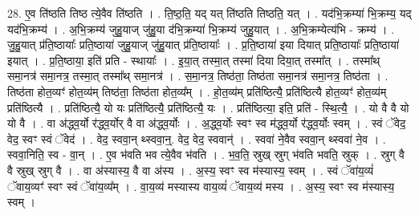 \documentclass[17pt]{extarticle}
\begin{document}
28. ए॒व ति॑ष्ठति तिष्ठ त्ये॒वैव ति॑ष्ठति । . ति॒ष्ठ॒ति॒ यद् यत् ति॑ष्ठति तिष्ठति॒ यत् । . यद॑भि॒क्रम्या॑ भि॒क्रम्य॒ यद् यद॑भि॒क्रम्य॑ । . अ॒भि॒क्रम्य॑ जुहु॒याज् जु॑हु॒या द॑भि॒क्रम्या॑ भि॒क्रम्य॑ जुहु॒यात् । . अ॒भि॒क्रम्येत्य॑भि - क्रम्य॑ । . जु॒हु॒यात् प्र॑ति॒ष्ठायाः᳚ प्रति॒ष्ठाया॑ जुहु॒याज् जु॑हु॒यात् प्र॑ति॒ष्ठायाः᳚ । . प्र॒ति॒ष्ठाया॑ इया दियात् प्रति॒ष्ठायाः᳚ प्रति॒ष्ठाया॑ इयात् । . प्र॒ति॒ष्ठाया॒ इति॑ प्रति - स्थायाः᳚ । . इ॒या॒त् तस्मा॒त् तस्मा॑ दिया दिया॒त् तस्मा᳚त् । . तस्मा᳚थ् समा॒नत्र॑ समा॒नत्र॒ तस्मा॒त् तस्मा᳚थ् समा॒नत्र॑ । . स॒मा॒नत्र॒ तिष्ठ॑ता॒ तिष्ठ॑ता समा॒नत्र॑ समा॒नत्र॒ तिष्ठ॑ता । . तिष्ठ॑ता होत॒व्यꣳ॑ होत॒व्य॑म् तिष्ठ॑ता॒ तिष्ठ॑ता होत॒व्य᳚म् । . हो॒त॒व्य॑म् प्रति॑ष्ठित्यै॒ प्रति॑ष्ठित्यै होत॒व्यꣳ॑ होत॒व्य॑म् प्रति॑ष्ठित्यै । . प्रति॑ष्ठित्यै॒ यो यः प्रति॑ष्ठित्यै॒ प्रति॑ष्ठित्यै॒ यः । . प्रति॑ष्ठित्या॒ इति॒ प्रति॑ - स्थि॒त्यै॒ । . यो वै वै यो यो वै । . वा अ॑द्ध्व॒र्यो र॑द्ध्व॒र्योर् वै वा अ॑द्ध्व॒र्योः । . अ॒द्ध्व॒र्योः स्वꣳ स्व म॑द्ध्व॒र्यो र॑द्ध्व॒र्योः स्वम् । . स्वं ॅवेद॒ वेद॒ स्वꣳ स्वं ॅवेद॑ । . वेद॒ स्ववा॒न् थ्स्ववा॒न्॒. वेद॒ वेद॒ स्ववान्॑ । . स्ववा॑ ने॒वैव स्ववा॒न् थ्स्ववा॑ ने॒व । . स्ववा॒निति॒ स्व - वा॒न् । . ए॒व भ॑वति भव त्ये॒वैव भ॑वति । . भ॒व॒ति॒ स्रुख् स्रुग् भ॑वति भवति॒ स्रुक् । . स्रुग् वै वै स्रुख् स्रुग् वै । . वा अ॑स्यास्य॒ वै वा अ॑स्य । . अ॒स्य॒ स्वꣳ स्व म॑स्यास्य॒ स्वम् । . स्वं ॅवा॑य॒व्यं॑ ॅवाय॒व्यꣳ॑ स्वꣳ स्वं ॅवा॑य॒व्य᳚म् । . वा॒य॒व्य॑ मस्यास्य वाय॒व्यं॑ ॅवाय॒व्य॑ मस्य । . अ॒स्य॒ स्वꣳ स्व म॑स्यास्य॒ स्वम् । \newline
\end{document}

